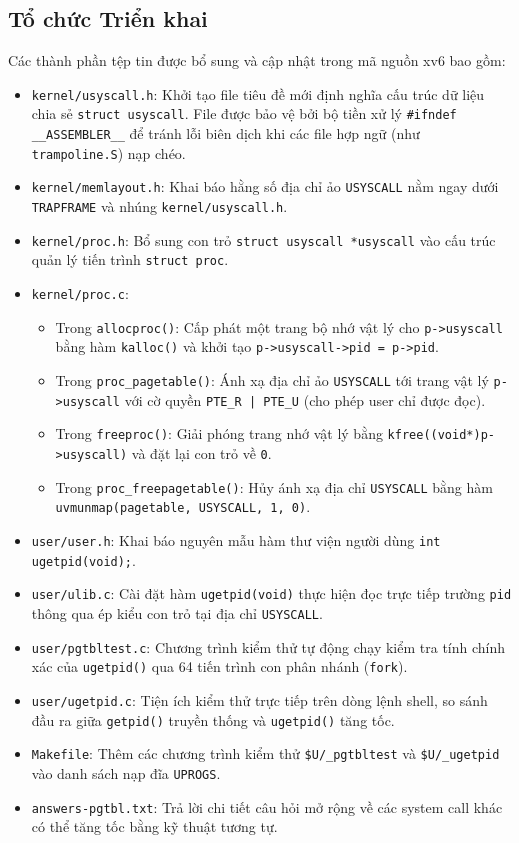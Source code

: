 \subsection{Tổ chức Triển khai}
Các thành phần tệp tin được bổ sung và cập nhật trong mã nguồn xv6 bao gồm:
\begin{itemize}
    \item \texttt{kernel/usyscall.h}: Khởi tạo file tiêu đề mới định nghĩa cấu trúc dữ liệu chia sẻ \texttt{struct usyscall}. File được bảo vệ bởi bộ tiền xử lý \texttt{\#ifndef \_\_ASSEMBLER\_\_} để tránh lỗi biên dịch khi các file hợp ngữ (như \texttt{trampoline.S}) nạp chéo.
    \item \texttt{kernel/memlayout.h}: Khai báo hằng số địa chỉ ảo \texttt{USYSCALL} nằm ngay dưới \texttt{TRAPFRAME} và nhúng \texttt{kernel/usyscall.h}.
    \item \texttt{kernel/proc.h}: Bổ sung con trỏ \texttt{struct usyscall *usyscall} vào cấu trúc quản lý tiến trình \texttt{struct proc}.
    \item \texttt{kernel/proc.c}:
    \begin{itemize}
        \item Trong \texttt{allocproc()}: Cấp phát một trang bộ nhớ vật lý cho \texttt{p->usyscall} bằng hàm \texttt{kalloc()} và khởi tạo \texttt{p->usyscall->pid = p->pid}.
        \item Trong \texttt{proc\_pagetable()}: Ánh xạ địa chỉ ảo \texttt{USYSCALL} tới trang vật lý \texttt{p->usyscall} với cờ quyền \texttt{PTE\_R | PTE\_U} (cho phép user chỉ được đọc).
        \item Trong \texttt{freeproc()}: Giải phóng trang nhớ vật lý bằng \texttt{kfree((void*)p->usyscall)} và đặt lại con trỏ về \texttt{0}.
        \item Trong \texttt{proc\_freepagetable()}: Hủy ánh xạ địa chỉ \texttt{USYSCALL} bằng hàm \texttt{uvmunmap(pagetable, USYSCALL, 1, 0)}.
    \end{itemize}
    \item \texttt{user/user.h}: Khai báo nguyên mẫu hàm thư viện người dùng \texttt{int ugetpid(void);}.
    \item \texttt{user/ulib.c}: Cài đặt hàm \texttt{ugetpid(void)} thực hiện đọc trực tiếp trường \texttt{pid} thông qua ép kiểu con trỏ tại địa chỉ \texttt{USYSCALL}.
    \item \texttt{user/pgtbltest.c}: Chương trình kiểm thử tự động chạy kiểm tra tính chính xác của \texttt{ugetpid()} qua 64 tiến trình con phân nhánh (\texttt{fork}).
    \item \texttt{user/ugetpid.c}: Tiện ích kiểm thử trực tiếp trên dòng lệnh shell, so sánh đầu ra giữa \texttt{getpid()} truyền thống và \texttt{ugetpid()} tăng tốc.
    \item \texttt{Makefile}: Thêm các chương trình kiểm thử \texttt{\$U/\_pgtbltest} và \texttt{\$U/\_ugetpid} vào danh sách nạp đĩa \texttt{UPROGS}.
    \item \texttt{answers-pgtbl.txt}: Trả lời chi tiết câu hỏi mở rộng về các system call khác có thể tăng tốc bằng kỹ thuật tương tự.
\end{itemize}

